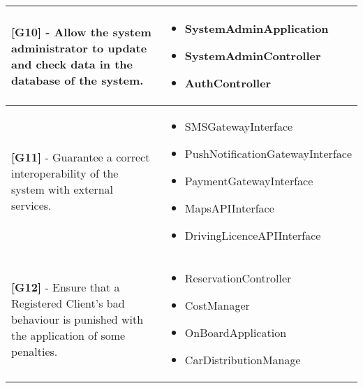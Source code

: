 \begin{longtable}{|l|l|}
\begin{minipage}[t]{0.5\textwidth}
\textbf{[G10]} - Allow the system administrator to update and check data in the database of the system.
\end{minipage} &
\begin{minipage}[t]{0.45\textwidth}
\begin{itemize}
\item SystemAdminApplication
\item SystemAdminController
\item AuthController
\end{itemize}
\end{minipage}\\ \hline
\begin{minipage}[t]{0.5\textwidth}
\textbf{[G11]} - Guarantee a correct interoperability of the system with external services.
\end{minipage} &
\begin{minipage}[t]{0.45\textwidth}
\begin{itemize}
\item SMSGatewayInterface
\item PushNotificationGatewayInterface
\item PaymentGatewayInterface
\item MapsAPIInterface
\item DrivingLicenceAPIInterface
\end{itemize}
\end{minipage}\\ \hline
\begin{minipage}[t]{0.5\textwidth}
\textbf{[G12]} - Ensure that a Registered Client’s bad behaviour is punished with the application of some penalties.
\end{minipage} &
\begin{minipage}[t]{0.45\textwidth}
\begin{itemize}
\item ReservationController
\item CostManager
\item OnBoardApplication
\item CarDistributionManage
\end{itemize}
\end{minipage}\\ \hline
\end{longtable}